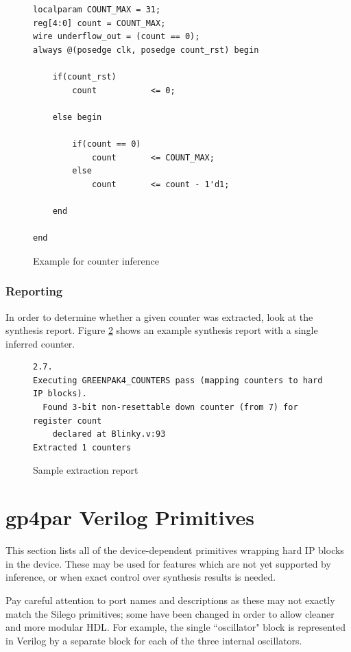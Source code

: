 \documentclass{article}
\begin{document}
\begin{figure}[h]
\begin{lstlisting}
localparam COUNT_MAX = 31;
reg[4:0] count = COUNT_MAX;
wire underflow_out = (count == 0);
always @(posedge clk, posedge count_rst) begin
	
	if(count_rst)
		count			<= 0;
	
	else begin

		if(count == 0)
			count		<= COUNT_MAX;
		else
			count		<= count - 1'd1;

	end
	
end
\end{lstlisting}
\caption{Example for counter inference}
\label{gp-countinfer-example}
\end{figure}

\subsubsection{Reporting}

In order to determine whether a given counter was extracted, look at the synthesis report. Figure 
\ref{counter-extraction} shows an example synthesis report with a single inferred counter.

\begin{figure}[h]
{\small
\begin{verbatim}
2.7.
Executing GREENPAK4_COUNTERS pass (mapping counters to hard IP blocks).
  Found 3-bit non-resettable down counter (from 7) for register count
    declared at Blinky.v:93
Extracted 1 counters
\end{verbatim}
}
\caption{Sample extraction report}
\label{counter-extraction}
\end{figure}


\pagebreak
\section{gp4par Verilog Primitives}

This section lists all of the device-dependent primitives wrapping hard IP blocks in the device. These may be used for 
features which are not yet supported by inference, or when exact control over synthesis results is needed.

Pay careful attention to port names and descriptions as these may not exactly match the Silego primitives; some have 
been changed in order to allow cleaner and more modular HDL. For example, the single ``oscillator" block is represented 
in Verilog by a separate block for each of the three internal oscillators.
\end{document}

